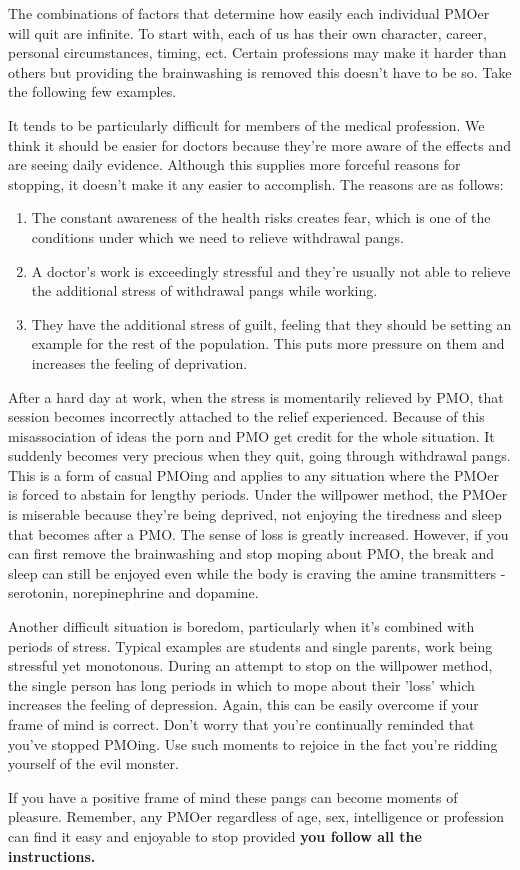 \documentclass[easypeasy.tex]{subfiles}
\begin{document}
The combinations of factors that determine how easily each individual PMOer will quit are infinite. To start with, each of us has their own character, career, personal circumstances, timing, ect. Certain professions may make it harder than others but providing the brainwashing is removed this doesn't have to be so. Take the following few examples.

It tends to be particularly difficult for members of the medical profession. We think it should be easier for doctors because they're more aware of the effects and are seeing daily evidence. Although this supplies more forceful reasons for stopping, it doesn't make it any easier to accomplish. The reasons are as follows:
  \begin{enumerate}
  \item The constant awareness of the health risks creates fear, which is one of the conditions under which we need to relieve withdrawal pangs.

  \item A doctor's work is exceedingly stressful and they're usually not able to relieve the additional stress of withdrawal pangs while working.

  \item They have the additional stress of guilt, feeling that they should be setting an example for the rest of the population. This puts more pressure on them and increases the feeling of deprivation.
\end{enumerate}
After a hard day at work, when the stress is momentarily relieved by PMO, that session becomes incorrectly attached to the relief experienced. Because of this misassociation of ideas the porn and PMO get credit for the whole situation. It suddenly becomes very precious when they quit, going through withdrawal pangs. This is a form of casual PMOing and applies to any situation where the PMOer is forced to abstain for lengthy periods. Under the willpower method, the PMOer is miserable because they're being deprived, not enjoying the tiredness and sleep that becomes after a PMO. The sense of loss is greatly increased. However, if you can first remove the brainwashing and stop moping about PMO, the break and sleep can still be enjoyed even while the body is craving the amine transmitters - serotonin, norepinephrine and dopamine.

Another difficult situation is boredom, particularly when it's combined with periods of stress. Typical examples are students and single parents, work being stressful yet monotonous. During an attempt to stop on the willpower method, the single person has long periods in which to mope about their 'loss' which increases the feeling of depression. Again, this can be easily overcome if your frame of mind is correct. Don't worry that you're continually reminded that you've stopped PMOing. Use such moments to rejoice in the fact you're ridding yourself of the evil monster.

If you have a positive frame of mind these pangs can become moments of pleasure. Remember, any PMOer regardless of age, sex, intelligence or profession can find it easy and enjoyable to stop provided \textbf{you follow all the instructions.}
\end{document}
